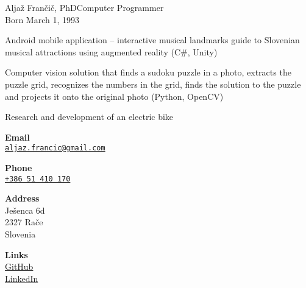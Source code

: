 \documentclass{article}
\begin{document}
\begin{cv}[avatar]{Aljaž Frančič, PhD}{Computer Programmer\\\small{Born March 1, 1993}}
\begin{cvevent}
\end{cvevent}

\cvseparator[2]
\begin{cvevent}
    Android mobile application – interactive musical landmarks guide to Slovenian musical attractions using augmented reality (C\#, Unity)
\end{cvevent}

\cvseparator[2]
\begin{cvevent}
   Computer vision solution that finds a sudoku puzzle in a photo, extracts the puzzle grid, recognizes the numbers in the grid, finds the solution to the puzzle and projects it onto the original photo (Python, OpenCV)
\end{cvevent}

\cvseparator[2]
\begin{cvevent}
    Research and development of an electric bike
\end{cvevent}


\cvsidebar %



\begin{cvitem}[Envelope][4]
    \textbf{Email}\\
    \href{mailto:aljaz.francic@gmail.com}{\texttt{aljaz.francic@gmail.com}}
\end{cvitem}

\cvseparator[3]
\begin{cvitem}[Phone][4]
    \textbf{Phone}\\
    \href{tel:+442071234567}{\texttt{+386 51 410 170}}
\end{cvitem}

\cvseparator[3]
\begin{cvitem}[Home][4]
    \textbf{Address}\\
    Ješenca 6d\\ 2327 Rače \\ Slovenia
\end{cvitem}

\cvseparator[3]
\begin{cvitem}[Globe][4]
     \textbf{Links}\\
     \href{https://github.com/aljazfrancic}{GitHub}\\
     \href{https://www.linkedin.com/in/aljazfrancic}{LinkedIn}
\end{cvitem}



\end{cv}
\end{document}
